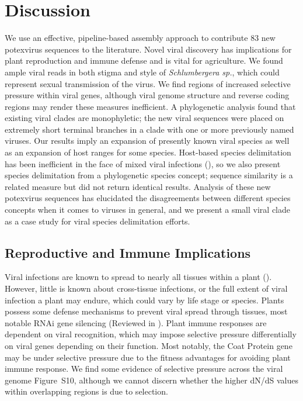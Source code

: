 \documentclass[fleqn,10pt,lineno]{wlpeerj}
\begin{document}
{%
\section*{Discussion}
We use an effective, pipeline-based assembly approach to contribute 83 new potexvirus sequences to the literature. 
Novel viral discovery has implications for plant reproduction and immune defense and is vital for agriculture.
We found ample viral reads in both stigma and style of \textit{Schlumbergera sp.}, which could represent sexual transmission of the virus.
We find regions of increased selective pressure within viral genes, although viral genome structure and reverse coding regions may render these measures inefficient.
A phylogenetic analysis found that existing viral clades are monophyletic; the new viral sequences were placed on extremely short terminal branches in a clade with one or more previously named viruses.
Our results imply an expansion of presently known viral species as well as an expansion of host ranges for some species.
Host-based species delimitation has been inefficient in the face of mixed viral infections (\citealt{li_viral_2015}), so we also present species delimitation from a phylogenetic species concept; sequence similarity is a related measure but did not return identical results.
Analysis of these new potexvirus sequences has elucidated the disagreements between different species concepts when it comes to viruses in general, and we present a small viral clade as a case study for viral species delimitation efforts.
 
 
\subsection*{Reproductive and Immune Implications}
Viral infections are known to spread to nearly all tissues within a plant (\citealt{Hipper_2013}). 
However, little is known about cross-tissue infections, or the full extent of viral infection a plant may endure, which could vary by life stage or species.
Plants possess some defense mechanisms to prevent viral spread through tissues, most notable RNAi gene silencing (Reviewed in \citealt{Hipper_2013}).
Plant immune responses are dependent on viral recognition, which may impose selective pressure differentially on viral genes depending on their function.
Most notably, the Coat Protein gene may be under selective pressure due to the fitness advantages for avoiding plant immune response. 
We find some evidence of selective pressure across the viral genome {Figure~S10}, although we cannot discern whether the higher dN/dS values within overlapping regions is due to selection.


}
\end{document}
